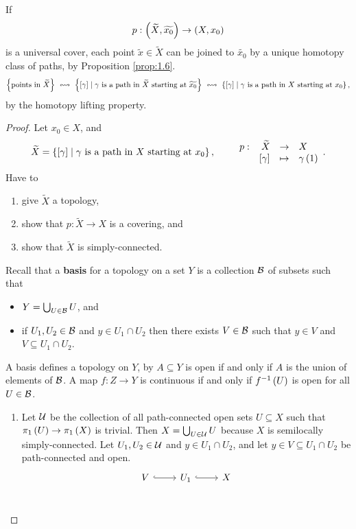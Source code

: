 \begin{remark*}
If
$$ p : \left( \widetilde{X}, \widetilde{x_0} \right) \to \left( X, x_0 \right) $$
is a universal cover, each point $ \widetilde{x} \in \widetilde{X} $ can be joined to $ \widetilde{x_0} $ by a unique homotopy class of paths, by Proposition \ref{prop:1.6}.
$$ \cb{\text{points in} \ \widetilde{X}} \ \leftrightsquigarrow \ \cb{\sb{\gamma} \mid \gamma \ \text{is a path in} \ \widetilde{X} \ \text{starting at} \ \widetilde{x_0}} \ \leftrightsquigarrow \ \cb{\sb{\gamma} \mid \gamma \ \text{is a path in} \ X \ \text{starting at} \ x_0}, $$
by the homotopy lifting property.
\end{remark*}

\begin{proof}
Let $ x_0 \in X $, and
$$ \widetilde{X} = \cb{\sb{\gamma} \mid \gamma \ \text{is a path in} \ X \ \text{starting at} \ x_0}, \qquad \function[p]{\widetilde{X}}{X}{\sb{\gamma}}{\gamma\rb{1}}. $$
Have to
\begin{enumerate}
\item give $ \widetilde{X} $ a topology,
\item show that $ p : \widetilde{X} \to X $ is a covering, and
\item show that $ \widetilde{X} $ is simply-connected.
\end{enumerate}
Recall that a \textbf{basis} for a topology on a set $ Y $ is a collection $ \BB $ of subsets such that
\begin{itemize}
\item $ Y = \bigcup_{U \in \BB} U $, and
\item if $ U_1, U_2 \in \BB $ and $ y \in U_1 \cap U_2 $ then there exists $ V \in \BB $ such that $ y \in V $ and $ V \subseteq U_1 \cap U_2 $.
\end{itemize}
A basis defines a topology on $ Y $, by $ A \subseteq Y $ is open if and only if $ A $ is the union of elements of $ \BB $. A map $ f : Z \to Y $ is continuous if and only if $ f^{-1}\rb{U} $ is open for all $ U \in \BB $.
\begin{enumerate}
\item Let $ \UU $ be the collection of all path-connected open sets $ U \subseteq X $ such that $ \pi_1\rb{U} \to \pi_1\rb{X} $ is trivial. Then $ X = \bigcup_{U \in \UU} U $ because $ X $ is semilocally simply-connected. Let $ U_1, U_2 \in \UU $ and $ y \in U_1 \cap U_2 $, and let $ y \in V \subseteq U_1 \cap U_2 $ be path-connected and open.
$$
\begin{tikzcd}
V \arrow[hookrightarrow]{r} & U_1 \arrow[hookrightarrow]{r} & X \\

\end{tikzcd}$$
\end{enumerate}
\end{proof}
